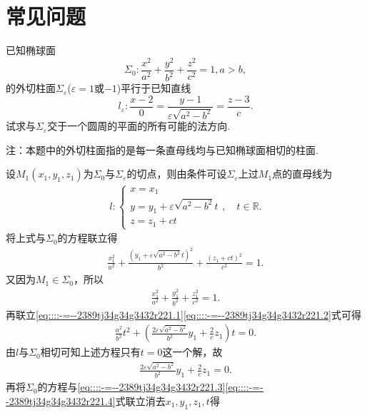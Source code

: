\documentclass[../../main.tex]{subfiles}%
\begin{document}
\section{常见问题}

\begin{example}
已知椭球面
$$
\Sigma_0:\frac{x^2}{a^2}+\frac{y^2}{b^2}+\frac{z^2}{c^2}=1,a>b,$$
的外切柱面$\Sigma_\varepsilon$($\varepsilon=1$或$-1$)平行于已知直线
$$
l_\varepsilon:\frac{x-2}{0}=\frac{y-1}{\varepsilon\sqrt{a^2-b^2}}=\frac{z-3}{c}.
$$
试求与$\Sigma_\varepsilon$交于一个圆周的平面的所有可能的法方向.

注：本题中的外切柱面指的是每一条直母线均与已知椭球面相切的柱面.
\end{example}
\begin{solution}

设$M_1(x_1,y_1,z_1)$为$\Sigma_0$与$\Sigma_\varepsilon$的切点，则由条件可设$\Sigma_\varepsilon$上过$M_1$点的直母线为
\begin{align}
l:\begin{cases}
x=x_1\\
y=y_1+\varepsilon \sqrt{a^2-b^2}t\\
z=z_1+ct
\end{cases}, \quad t\in \mathbb{R}. \label{eq::::-=--2389tj34g34g3432r221.4}
\end{align}
将上式与$\Sigma_0$的方程联立得
\begin{align}
\frac{x_1^2}{a^2}+\frac{(y_1+\varepsilon \sqrt{a^2-b^2}t)^2}{b^2}+\frac{(z_1+ct)^2}{c^2}=1. \label{eq::::-=--2389tj34g34g3432r221.1}
\end{align}
又因为$M_1\in \Sigma_0$，所以
\begin{align}
\frac{x_1^2}{a^2}+\frac{y_1^2}{b^2}+\frac{z_1^2}{c^2}=1. \label{eq::::-=--2389tj34g34g3432r221.2}
\end{align}
再联立\eqref{eq::::-=--2389tj34g34g3432r221.1}\eqref{eq::::-=--2389tj34g34g3432r221.2}式可得
\begin{align*}
\frac{a^2}{b^2}t^2+\left( \frac{2\varepsilon \sqrt{a^2-b^2}}{b^2}y_1+\frac{2}{c}z_1 \right) t=0.
\end{align*}
由$l$与$\Sigma_0$相切可知上述方程只有$t=0$这一个解，故
\begin{align}
\frac{2\varepsilon \sqrt{a^2-b^2}}{b^2}y_1+\frac{2}{c}z_1=0. \label{eq::::-=--2389tj34g34g3432r221.3}
\end{align}
再将$\Sigma_0$的方程与\eqref{eq::::-=--2389tj34g34g3432r221.3}\eqref{eq::::-=--2389tj34g34g3432r221.4}式联立消去$x_1,y_1,z_1,t$得
\begin{align*}

\end{align*}
\end{solution}
\end{document}
